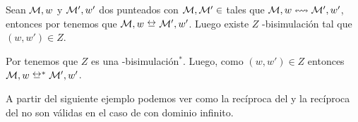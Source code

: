 \begin{demostracion}
    Sean $\mathcal{M},w$ y $\mathcal{M}',w'$ dos \ultss punteados con $\mathcal{M}, \mathcal{M}' \in $ \MFD tales que $\mathcal{M},w \mathrel{\leftrightsquigarrow} \mathcal{M}', w'$, 
    entonces por  tenemos que $\model,w \bisim \model', w'$. 
    Luego existe $Z$ \KHilogic-bisimulación tal que $(w,w') \in Z$.

    Por  tenemos que $Z$ es una \KHilogic-bisimulación$^*$. Luego, como $(w,w') \in Z$ 
    entonces $\model,w \bisim^* \model', w'$.
\end{demostracion}

A partir del siguiente ejemplo podemos ver como la recíproca del  y la recíproca 
del  no son válidas en el caso de \ultss con dominio infinito.

